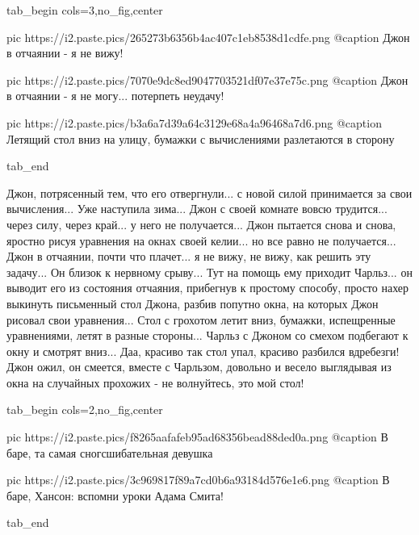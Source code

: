 \ifcmt
  tab_begin cols=3,no_fig,center

		 pic https://i2.paste.pics/265273b6356b4ac407c1eb8538d1cdfe.png
		 @caption Джон в отчаянии - я не вижу!

		 pic https://i2.paste.pics/7070e9dc8ed9047703521df07e37e75c.png
		 @caption Джон в отчаянии - я не могу... потерпеть неудачу! 

		 pic https://i2.paste.pics/b3a6a7d39a64c3129e68a4a96468a7d6.png
		 @caption Летящий стол вниз на улицу, бумажки с вычислениями разлетаются в сторону

  tab_end
\fi

Джон, потрясенный тем, что его отвергнули... с новой силой принимается за свои
вычисления...  Уже наступила зима... Джон с своей комнате вовсю трудится...
через силу, через край...  у него не получается... Джон пытается снова и снова,
яростно рисуя уравнения на окнах своей келии... но все равно не получается...
Джон в отчаянии, почти что плачет... я не вижу, не вижу, как решить эту
задачу... Он близок к нервному срыву... Тут на помощь ему приходит Чарльз...
он выводит его из состояния отчаяния, прибегнув к простому способу, просто
нахер выкинуть письменный стол Джона, разбив попутно окна, на которых Джон
рисовал свои уравнения... Стол с грохотом летит вниз, бумажки, испещренные
уравнениями, летят в разные стороны... Чарльз с Джоном со смехом подбегают к
окну и смотрят вниз... Даа, красиво так стол упал, красиво разбился вдребезги!
Джон ожил, он смеется, вместе с Чарльзом, довольно и весело выглядывая из окна на
случайных прохожих - не волнуйтесь, это мой стол!

\ifcmt
  tab_begin cols=2,no_fig,center

     pic https://i2.paste.pics/f8265aafafeb95ad68356bead88ded0a.png
		 @caption В баре, та самая сногсшибательная девушка

		 pic https://i2.paste.pics/3c969817f89a7cd0b6a93184d576e1e6.png
		 @caption В баре, Хансон: вспомни уроки Адама Смита!

  tab_end
\fi

